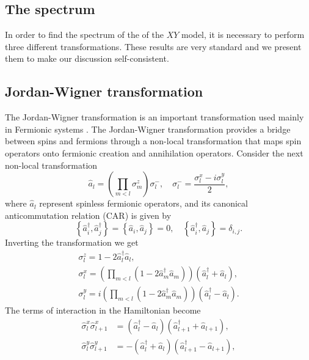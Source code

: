 \subsection{The spectrum}
In order to find the spectrum of the of the $XY$ model, it is necessary to perform three different transformations. These results are very standard and we present them to make our discussion self-consistent.
\subsection{Jordan-Wigner transformation}
The Jordan-Wigner transformation is an important transformation used mainly in Fermionic systems  \cite{Michael_nielsen_2005}. The Jordan-Wigner transformation provides a bridge between spins and fermions through a non-local transformation that maps spin operators onto fermionic creation and annihilation operators. Consider the next non-local transformation
\begin{equation}
\hat{a}_{l}=\left(\prod_{m<l} \sigma_{m}^{z}\right) \sigma_{l}^{-}, \quad \sigma_{l}^{-}=\frac{\sigma_{l}^{x}-i \sigma_{l}^{y}}{2},
\end{equation}
where $\hat{a}_l$ represent spinless fermionic operators, and its canonical anticommutation relation (CAR) is given by\cite{reyes-lega_aspects_2016} 
\begin{equation}
\left\{\hat{a}_{i}^{\dagger}, \hat{a}_{j}^{\dagger}\right\}=\left\{\hat{a}_{i}, \hat{a}_{j}\right\}=0, \quad\left\{\hat{a}_{i}^{\dagger}, \hat{a}_{j}\right\}=\delta_{i, j}.
\end{equation}
Inverting the transformation we get 
\begin{equation}
\begin{array}{l}
\sigma_{l}^{z}=1-2 \hat{a}_{l}^{\dagger} \hat{a}_{l}, \\
\sigma_{l}^{x}=\left(\prod_{m<l}\left(1-2 \hat{a}_{m}^{\dagger} \hat{a}_{m}\right)\right)\left(\hat{a}_{l}^{\dagger}+\hat{a}_{l}\right), \\
\sigma_{l}^{y}=i\left(\prod_{m<l}\left(1-2 \hat{a}_{m}^{\dagger} \hat{a}_{m}\right)\right)\left(\hat{a}_{l}^{\dagger}-\hat{a}_{l}\right).
\end{array}
\end{equation}
The terms of interaction in the Hamiltonian become
\begin{equation}
\begin{aligned}
\hat{\sigma}_{l}^{x} \hat{\sigma}_{l+1}^{x} &=\left(\hat{a}_{l}^{\dagger}-\hat{a}_{l}\right)\left(\hat{a}_{l+1}^{\dagger}+\hat{a}_{l+1}\right), \\
\hat{\sigma}_{l}^{y} \hat{\sigma}_{l+1}^{y} &=-\left(\hat{a}_{l}^{\dagger}+\hat{a}_{l}\right)\left(\hat{a}_{l+1}^{\dagger}-\hat{a}_{l+1}\right),
\end{aligned}
\end{equation}
